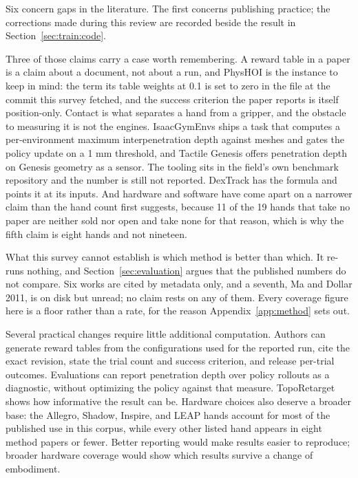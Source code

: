 Six concern gaps in the literature. The first concerns publishing practice; the corrections made
during this review are recorded beside the result in Section~\ref{sec:train:code}.

Three of those claims carry a case worth remembering. A reward table in a paper is a claim about a
document, not about a run, and PhysHOI \cite{physhoi_2023} is the instance to keep in mind: the
term its table weights at 0.1 is set to zero in the file at the commit this survey fetched, and
the success criterion the paper reports is itself position-only. Contact is what separates a hand from a gripper, and the obstacle to measuring
it is not the engines. IsaacGymEnvs ships a task that computes a per-environment maximum
interpenetration depth against meshes and gates the policy update on a 1 mm threshold, and Tactile
Genesis \cite{tactile_genesis_2026} offers penetration depth on Genesis geometry as a sensor. The
tooling sits in the field's own benchmark repository and the number is still not reported. DexTrack
\cite{dextrack_2025} has the formula and points it at its inputs. And hardware and software have
come apart on a narrower claim than the hand count first suggests, because 11 of the 19 hands that
take no paper are neither sold nor open and take none for that reason, which is why the fifth
claim is eight hands and not nineteen.

What this survey cannot establish is which method is better than which. It re-runs nothing, and
Section~\ref{sec:evaluation} argues that the published numbers do not compare. Six works are cited
by metadata only, and a seventh, Ma and Dollar 2011, is on disk but unread; no claim rests on any
of them. Every coverage figure here is a floor rather than a rate, for the reason
Appendix~\ref{app:method} sets out.

Several practical changes require little additional computation. Authors can generate reward
tables from the configurations used for the reported run, cite the exact revision, state the trial
count and success criterion, and release per-trial outcomes. Evaluations can report penetration
depth over policy rollouts as a diagnostic, without optimizing the policy against that measure.
TopoRetarget \cite{toporetarget_2026} shows how informative the result can be. Hardware choices
also deserve a broader base: the Allegro, Shadow, Inspire, and LEAP hands account for most of the
published use in this corpus, while every other listed hand appears in eight method papers or
fewer. Better reporting would make results easier to reproduce; broader hardware coverage would
show which results survive a change of embodiment.

